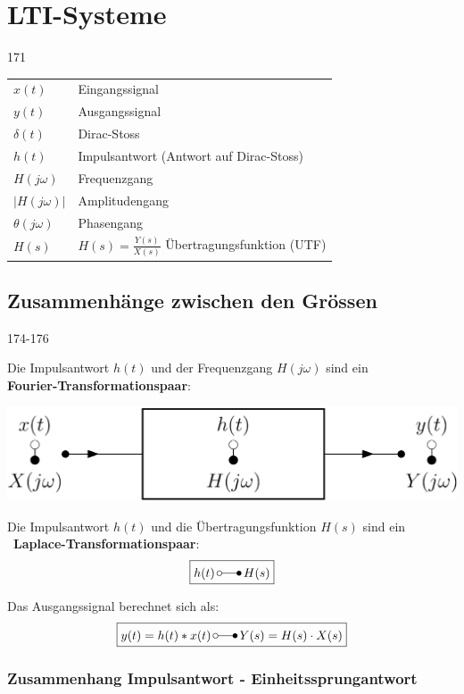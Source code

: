 \section{LTI-Systeme}{171}

\begin{tabular}{ll}
    $x(t)$              & Eingangssignal \\
    $y(t)$              & Ausgangssignal \\
    $\delta(t)$         & Dirac-Stoss \\
    $h(t)$              & Impulsantwort (Antwort auf Dirac-Stoss) \\
    $H(j \omega)$       & Frequenzgang \\
    $|H(j \omega)|$     & Amplitudengang \\
    $\theta(j \omega)$  & Phasengang \\
    $H(s)$              & $H(s) = \frac{Y(s)}{X(s)}$ Übertragungsfunktion (UTF)
\end{tabular}


\subsection{Zusammenhänge zwischen den Grössen}{174-176}
\label{Zusammenhang}

Die Impulsantwort $h(t)$ und der Frequenzgang $H(j \omega)$ sind ein \\
\textbf{Fourier-Transformationspaar}:

\begin{center}
    \includegraphics[width=0.7\columnwidth]{images/frequenzgang_impulsantwort.png} \\
\end{center}

Die Impulsantwort $h(t)$ und die Übertragungsfunktion $H(s)$ sind ein\\\
\textbf{Laplace-Transformationspaar}:
$$ \boxed{ h(t) \, \laplace \, H(s) } $$

Das Ausgangssignal berechnet sich als: 
$$ \boxed{ y(t) = h(t) * x(t) \, \laplace \, Y(s) = H(s) \cdot X(s) } $$


\subsubsection{Zusammenhang Impulsantwort - Einheitssprungantwort}

